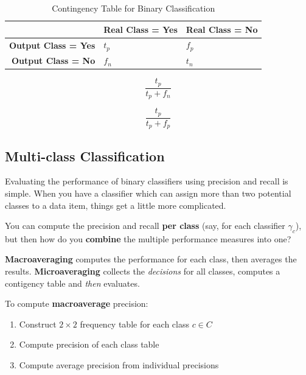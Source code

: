 \documentclass{article}
\begin{document}
\begin{table}[H]
	\centering
	\begin{tabular}{|r|l|l|}
		\hline
		& \textbf{Real Class = Yes} & \textbf{Real Class = No} \\
		\hline
		\textbf{Output Class = Yes} & $t_p$ & $f_p$ \\
		\textbf{Output Class = No} & $f_n$ & $t_n$ \\
		\hline
	\end{tabular}
	\caption{Contingency Table for Binary Classification}
	\label{tab:bin-classify-example-contingency}
\end{table}

\begin{equation}
	\frac{t_p}{t_p + f_n}
	\label{eq:bin-classify-recall}
\end{equation}

\begin{equation}
	\frac{t_p}{t_p + f_p}
	\label{eq:bin-classify-precision}
\end{equation}

\subsection{Multi-class Classification}
\label{sec:multiclass-classifier-evaluation}

Evaluating the performance of binary classifiers using precision and recall is simple. When you have a classifier which can assign more than two potential classes to a data item, things get a little more complicated.

You can compute the precision and recall \textbf{per class} (say, for each classifier $\gamma_c$), but then how do you \textbf{combine} the multiple performance measures into one?

\textbf{Macroaveraging} computes the performance for each class, then averages the results. \textbf{Microaveraging} collects the \textit{decisions} for all classes, computes a contigency table and \textit{then} evaluates.

To compute \textbf{macroaverage} precision:
\begin{enumerate}
	\item Construct $2 \times 2$ frequency table for each class $c \in C$
	\item Compute precision of each class table
	\item Compute average precision from individual precisions
\end{enumerate}
\end{document}

